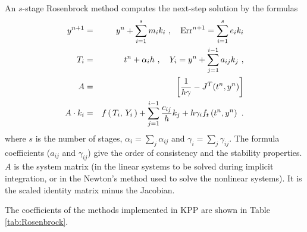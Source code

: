 \documentclass[twoside]{article}
\begin{document}
An $s$-stage Rosenbrock method \cite[Section IV.7]{k:HW2} computes the
next-step solution by the formulas
%
\begin{eqnarray}
\label{eqn:altRosenbrock}
y^{n+1} &=& y^n + \sum_{i=1}^s m_i k_i~,
\quad {\rm Err}^{n+1} = \sum_{i=1}^s e_i k_i\\
\nonumber
T_i &=& t^n + \alpha_i h~, \quad
Y_i =y^n + \sum_{j=1}^{i-1} a_{ij} k_j~,\\
\nonumber
A &=& \left[ \frac{1}{h \gamma} - J^T(t^n,y^n) \right]\\
\nonumber
A \cdot k_i &=&  f\left( \, T_i,
\, Y_i \,\right) + \sum_{j=1}^{i-1} \frac{c_{ij}}{h} k_j + h \gamma_i
f_t\left(t^n,y^n\right)~.
\end{eqnarray}
%
where $s$ is the number of stages, $\alpha_i = \sum_j \alpha_{ij}$ and
$\gamma_i = \sum_j \gamma_{ij}$. The formula coefficients ($a_{ij}$ and
$\gamma_{ij}$) give the order of consistency and the stability
properties. $A$ is the system matrix (in the linear systems to be solved
during implicit integration, or in the Newton's method used to solve the
nonlinear systems). It is the scaled identity matrix minus the Jacobian.

The coefficients of the methods implemented in KPP are shown in Table
\ref{tab:Rosenbrock}.
\end{document}
